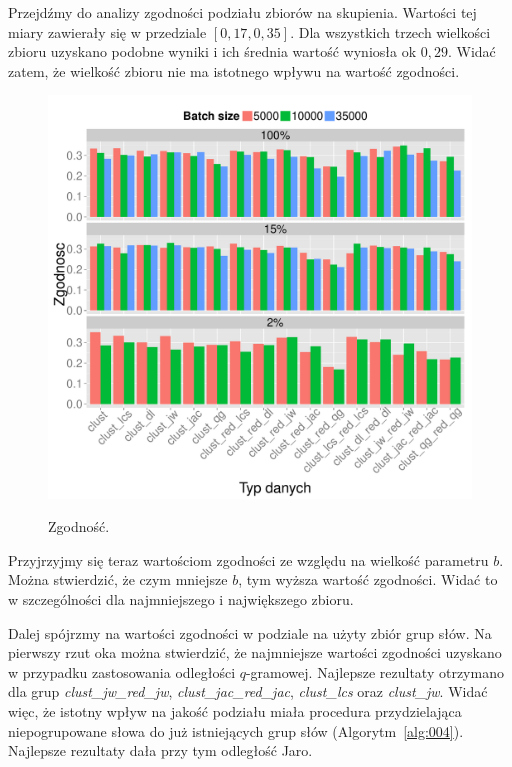 \documentclass{praca1}
\begin{document}
Przejdźmy do analizy zgodności podziału zbiorów na skupienia. Wartości tej miary zawierały się w przedziale $[0,17, 0,35]$. Dla wszystkich trzech wielkości zbioru uzyskano podobne wyniki i ich średnia wartość wyniosła ok $0,29$. Widać zatem, że wielkość zbioru nie ma istotnego wpływu na wartość zgodności.


\begin{figure}[!h]
  \centering
  \includegraphics[width=420pt]{plot11.pdf}\\
  \caption{Zgodność.}\label{plot:006}
\end{figure}

Przyjrzyjmy się teraz wartościom zgodności ze względu na wielkość parametru $b$. Można stwierdzić, że czym mniejsze $b$, tym wyższa wartość zgodności. Widać to w szczególności dla najmniejszego i największego zbioru.

Dalej spójrzmy na wartości zgodności w podziale na użyty zbiór grup słów. Na pierwszy rzut oka można stwierdzić, że najmniejsze wartości zgodności uzyskano w przypadku zastosowania odległości $q$-gramowej. Najlepsze rezultaty otrzymano dla grup \emph{clust\_jw\_red\_jw}, \emph{clust\_jac\_red\_jac}, \emph{clust\_lcs} oraz \emph{clust\_jw}. Widać więc, że istotny wpływ na jakość podziału miała procedura przydzielająca niepogrupowane słowa do już istniejących grup słów (Algorytm~\ref{alg:004}). Najlepsze rezultaty dała przy tym odległość Jaro.
\end{document}
